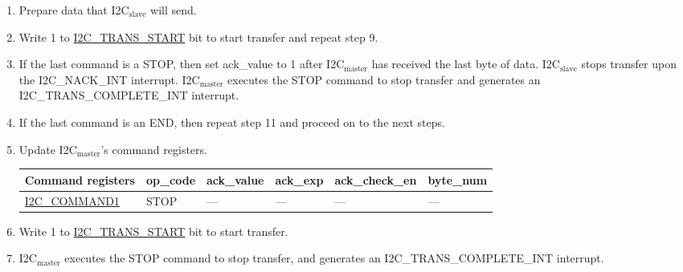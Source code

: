 \documentclass[main\_\_EN.tex]{subfiles}
\begin{document}
\begin{enumerate}
\item Prepare data that I2C$_\text{slave}$ will send.
\item Write 1 to \hyperref[fielddesc:I2CTRANSSTART]{I2C\_TRANS\_START}  bit to start transfer and repeat step 9.
\item If the last command is a STOP, then set ack\_value to 1 after I2C$_\text{master}$ has received the last byte of data. I2C$_\text{slave}$ stops transfer upon the I2C\_NACK\_INT interrupt. I2C$_\text{master}$ executes the STOP command to stop transfer and generates an I2C\_TRANS\_COMPLETE\_INT interrupt.
\item If the last command is an END, then repeat step 11 and proceed on to the next steps.
\item Update I2C$_\text{master}$'s command registers.
\begin{longtable}{ | p{4cm} | p{2cm} | p{2cm} | p{2cm} |p{2cm} | p{2cm} |}
\hline\rowcolor{lightgray}
Command registers & op\_code & ack\_value&ack\_exp&ack\_check\_en&byte\_num  \\ \hline
\hyperref[fielddesc:I2CCOMMAND1]{I2C\_COMMAND1} & STOP& ---&---&---&---  \\ \hline
\end{longtable}
\item Write 1 to \hyperref[fielddesc:I2CTRANSSTART]{I2C\_TRANS\_START}  bit to start transfer.
\item I2C$_\text{master}$ executes the STOP command to stop transfer, and generates an I2C\_TRANS\_COMPLETE\_INT interrupt.

\end{enumerate}
\end{document}
